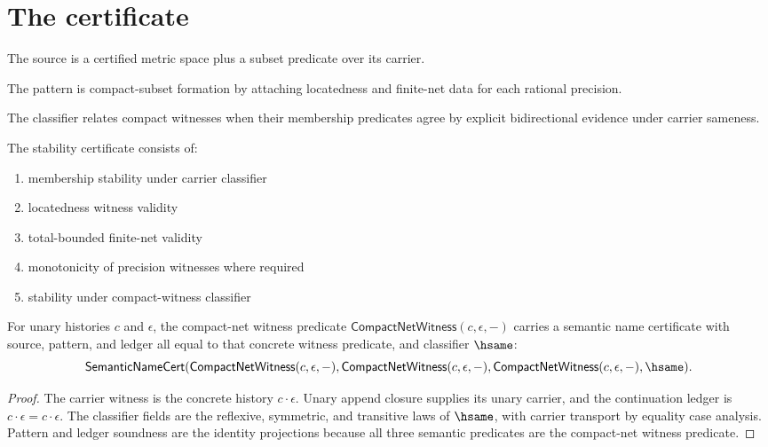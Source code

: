 \section{The certificate}

\begin{definition}
\label{def:compact-source-specification}
The source is a certified metric space plus a subset predicate over its carrier.
\end{definition}

\begin{definition}
\label{def:compact-pattern-specification}
The pattern is compact-subset formation by attaching locatedness and finite-net data for each rational precision.
\end{definition}

\begin{definition}
\label{def:compact-classifier-specification}
The classifier relates compact witnesses when their membership predicates agree by explicit bidirectional evidence under carrier sameness.
\end{definition}

\begin{definition}
\label{def:compact-stability-certificate}
The stability certificate consists of:
\begin{enumerate}
  \item membership stability under carrier classifier
  \item locatedness witness validity
  \item total-bounded finite-net validity
  \item monotonicity of precision witnesses where required
  \item stability under compact-witness classifier
\end{enumerate}
\end{definition}

\begin{theorem}
\label{thm:compact-net-witness-semantic-namecert}
For unary histories $c$ and $\epsilon$, the compact-net witness predicate
$\mathsf{CompactNetWitness}(c,\epsilon,-)$ carries a semantic name certificate
with source, pattern, and ledger all equal to that concrete witness predicate,
and classifier $\hsame$:
$$
\mathsf{SemanticNameCert}
(\mathsf{CompactNetWitness}(c,\epsilon,-),
 \mathsf{CompactNetWitness}(c,\epsilon,-),
 \mathsf{CompactNetWitness}(c,\epsilon,-),
 \hsame).
$$
\end{theorem}
\begin{proof}
The carrier witness is the concrete history $c\cdot\epsilon$. Unary append
closure supplies its unary carrier, and the continuation ledger is
$c\cdot\epsilon=c\cdot\epsilon$. The classifier fields are the reflexive,
symmetric, and transitive laws of $\hsame$, with carrier transport by equality
case analysis. Pattern and ledger soundness are the identity projections
because all three semantic predicates are the compact-net witness predicate.
\end{proof}

